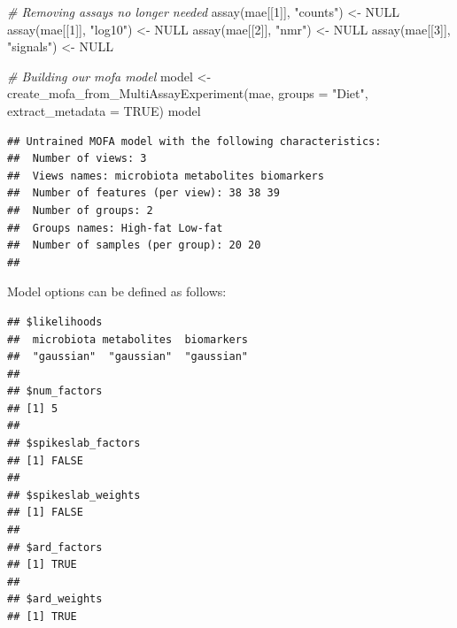 \documentclass[
]{book}
\newenvironment{Shaded}{\begin{snugshade}}{\end{snugshade}}
\newcommand{\AttributeTok}[1]{\textcolor[rgb]{0.77,0.63,0.00}{#1}}
\newcommand{\CommentTok}[1]{\textcolor[rgb]{0.56,0.35,0.01}{\textit{#1}}}
\newcommand{\ConstantTok}[1]{\textcolor[rgb]{0.00,0.00,0.00}{#1}}
\newcommand{\DecValTok}[1]{\textcolor[rgb]{0.00,0.00,0.81}{#1}}
\newcommand{\FunctionTok}[1]{\textcolor[rgb]{0.00,0.00,0.00}{#1}}
\newcommand{\NormalTok}[1]{#1}
\newcommand{\OtherTok}[1]{\textcolor[rgb]{0.56,0.35,0.01}{#1}}
\newcommand{\SpecialCharTok}[1]{\textcolor[rgb]{0.00,0.00,0.00}{#1}}
\newcommand{\StringTok}[1]{\textcolor[rgb]{0.31,0.60,0.02}{#1}}
\begin{document}
\begin{Shaded}
\begin{Highlighting}[]
\CommentTok{\# Removing assays no longer needed}
\FunctionTok{assay}\NormalTok{(mae[[}\DecValTok{1}\NormalTok{]], }\StringTok{"counts"}\NormalTok{) }\OtherTok{\textless{}{-}} \ConstantTok{NULL}
\FunctionTok{assay}\NormalTok{(mae[[}\DecValTok{1}\NormalTok{]], }\StringTok{"log10"}\NormalTok{) }\OtherTok{\textless{}{-}} \ConstantTok{NULL}
\FunctionTok{assay}\NormalTok{(mae[[}\DecValTok{2}\NormalTok{]], }\StringTok{"nmr"}\NormalTok{) }\OtherTok{\textless{}{-}} \ConstantTok{NULL}
\FunctionTok{assay}\NormalTok{(mae[[}\DecValTok{3}\NormalTok{]], }\StringTok{"signals"}\NormalTok{) }\OtherTok{\textless{}{-}} \ConstantTok{NULL}

\CommentTok{\# Building our mofa model}
\NormalTok{model }\OtherTok{\textless{}{-}} \FunctionTok{create\_mofa\_from\_MultiAssayExperiment}\NormalTok{(mae,}
                                               \AttributeTok{groups =} \StringTok{"Diet"}\NormalTok{, }
                                               \AttributeTok{extract\_metadata =} \ConstantTok{TRUE}\NormalTok{)}
\NormalTok{model}
\end{Highlighting}
\end{Shaded}

\begin{verbatim}
## Untrained MOFA model with the following characteristics: 
##  Number of views: 3 
##  Views names: microbiota metabolites biomarkers 
##  Number of features (per view): 38 38 39 
##  Number of groups: 2 
##  Groups names: High-fat Low-fat 
##  Number of samples (per group): 20 20 
## 
\end{verbatim}

Model options can be defined as follows:

\begin{Shaded}
\end{Shaded}

\begin{verbatim}
## $likelihoods
##  microbiota metabolites  biomarkers 
##  "gaussian"  "gaussian"  "gaussian" 
## 
## $num_factors
## [1] 5
## 
## $spikeslab_factors
## [1] FALSE
## 
## $spikeslab_weights
## [1] FALSE
## 
## $ard_factors
## [1] TRUE
## 
## $ard_weights
## [1] TRUE
\end{verbatim}
\end{document}
